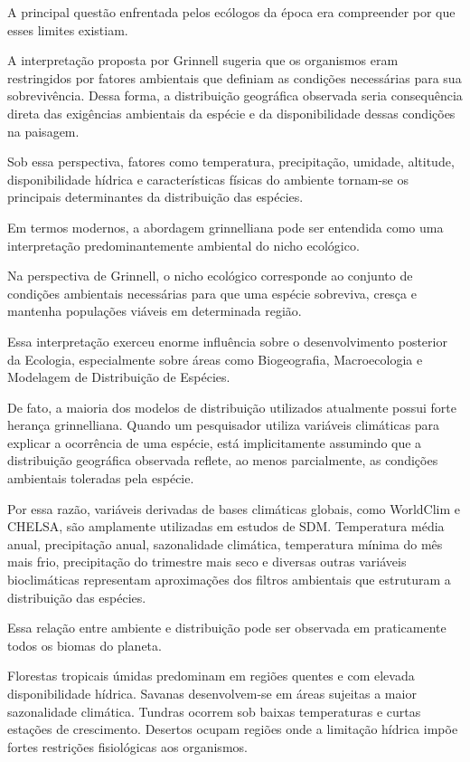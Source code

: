 A principal questão enfrentada pelos ecólogos da época era compreender por que esses limites existiam.

A interpretação proposta por Grinnell sugeria que os organismos eram restringidos por fatores ambientais que definiam as condições necessárias para sua sobrevivência. Dessa forma, a distribuição geográfica observada seria consequência direta das exigências ambientais da espécie e da disponibilidade dessas condições na paisagem.

Sob essa perspectiva, fatores como temperatura, precipitação, umidade, altitude, disponibilidade hídrica e características físicas do ambiente tornam-se os principais determinantes da distribuição das espécies.

Em termos modernos, a abordagem grinnelliana pode ser entendida como uma interpretação predominantemente ambiental do nicho ecológico.

\begin{conceito}
	Na perspectiva de Grinnell, o nicho ecológico corresponde ao conjunto de condições ambientais necessárias para que uma espécie sobreviva, cresça e mantenha populações viáveis em determinada região.
\end{conceito}

Essa interpretação exerceu enorme influência sobre o desenvolvimento posterior da Ecologia, especialmente sobre áreas como Biogeografia, Macroecologia e Modelagem de Distribuição de Espécies.

De fato, a maioria dos modelos de distribuição utilizados atualmente possui forte herança grinnelliana. Quando um pesquisador utiliza variáveis climáticas para explicar a ocorrência de uma espécie, está implicitamente assumindo que a distribuição geográfica observada reflete, ao menos parcialmente, as condições ambientais toleradas pela espécie.

Por essa razão, variáveis derivadas de bases climáticas globais, como WorldClim e CHELSA, são amplamente utilizadas em estudos de SDM. Temperatura média anual, precipitação anual, sazonalidade climática, temperatura mínima do mês mais frio, precipitação do trimestre mais seco e diversas outras variáveis bioclimáticas representam aproximações dos filtros ambientais que estruturam a distribuição das espécies.

Essa relação entre ambiente e distribuição pode ser observada em praticamente todos os biomas do planeta.

Florestas tropicais úmidas predominam em regiões quentes e com elevada disponibilidade hídrica. Savanas desenvolvem-se em áreas sujeitas a maior sazonalidade climática. Tundras ocorrem sob baixas temperaturas e curtas estações de crescimento. Desertos ocupam regiões onde a limitação hídrica impõe fortes restrições fisiológicas aos organismos.

